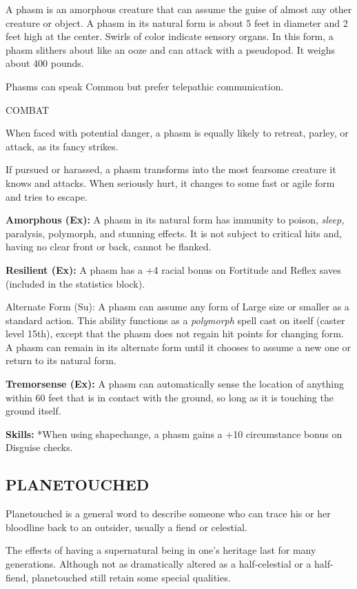 \documentclass{article}
\begin{document}
A phasm is an amorphous creature that can assume the guise of almost any other 
creature or object. A phasm in its natural form is about 5 feet in diameter and 
2 feet high at the center. Swirls of color indicate sensory organs. In this form, 
a phasm slithers about like an ooze and can attack with a pseudopod. It weighs 
about 400 pounds.

Phasms can speak Common but prefer telepathic communication.

COMBAT

When faced with potential danger, a phasm is equally likely to retreat, parley, 
or attack, as its fancy strikes. 

If pursued or harassed, a phasm transforms into the most fearsome creature it knows 
and attacks. When seriously hurt, it changes to some fast or agile form and tries 
to escape.

\textbf{Amorphous (Ex): }A phasm in its natural form has immunity to poison, \textit{sleep, 
}paralysis, polymorph, and stunning effects. It is not subject to critical hits 
and, having no clear front or back, cannot be flanked.

\textbf{Resilient (Ex): }A phasm has a +4 racial bonus on Fortitude and Reflex 
saves (included in the statistics block).

Alternate Form (Su): A phasm can assume any form of Large size or smaller as a 
standard action. This ability functions as a \textit{polymorph }spell cast on itself 
(caster level 15th), except that the phasm does not regain hit points for changing 
form. A phasm can remain in its alternate form until it chooses to assume a new 
one or return to its natural form.

\textbf{Tremorsense (Ex):} A phasm can automatically sense the location of anything 
within 60 feet that is in contact with the ground, so long as it is touching the 
ground itself.

\textbf{Skills:} *When using shapechange, a phasm gains a +10 circumstance bonus 
on Disguise checks.

\vspace{12pt}
\subsection*{{\LARGE{}PLANETOUCHED}}

Planetouched is a general word to describe someone who can trace his or her bloodline 
back to an outsider, usually a fiend or celestial.

The effects of having a supernatural being in one's heritage last for many generations. 
Although not as dramatically altered as a half-celestial or a half-fiend, planetouched 
still retain some special qualities.
\end{document}
